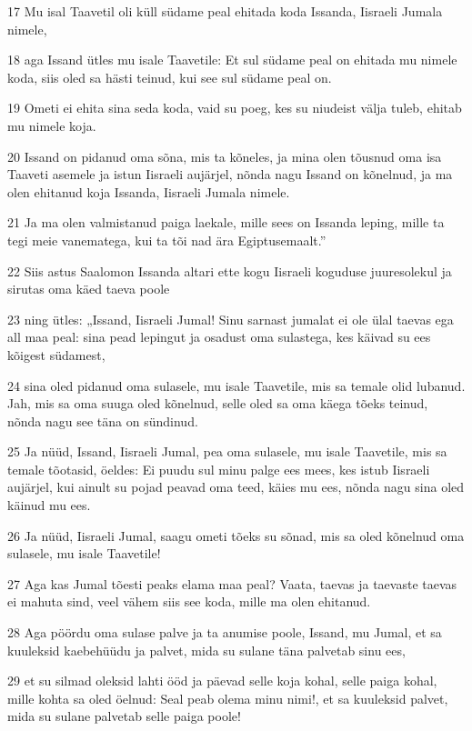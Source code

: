 \par 17 Mu isal Taavetil oli küll südame peal ehitada koda Issanda, Iisraeli Jumala nimele,
\par 18 aga Issand ütles mu isale Taavetile: Et sul südame peal on ehitada mu nimele koda, siis oled sa hästi teinud, kui see sul südame peal on.
\par 19 Ometi ei ehita sina seda koda, vaid su poeg, kes su niudeist välja tuleb, ehitab mu nimele koja.
\par 20 Issand on pidanud oma sõna, mis ta kõneles, ja mina olen tõusnud oma isa Taaveti asemele ja istun Iisraeli aujärjel, nõnda nagu Issand on kõnelnud, ja ma olen ehitanud koja Issanda, Iisraeli Jumala nimele.
\par 21 Ja ma olen valmistanud paiga laekale, mille sees on Issanda leping, mille ta tegi meie vanematega, kui ta tõi nad ära Egiptusemaalt.”
\par 22 Siis astus Saalomon Issanda altari ette kogu Iisraeli koguduse juuresolekul ja sirutas oma käed taeva poole
\par 23 ning ütles: „Issand, Iisraeli Jumal! Sinu sarnast jumalat ei ole ülal taevas ega all maa peal: sina pead lepingut ja osadust oma sulastega, kes käivad su ees kõigest südamest,
\par 24 sina oled pidanud oma sulasele, mu isale Taavetile, mis sa temale olid lubanud. Jah, mis sa oma suuga oled kõnelnud, selle oled sa oma käega tõeks teinud, nõnda nagu see täna on sündinud.
\par 25 Ja nüüd, Issand, Iisraeli Jumal, pea oma sulasele, mu isale Taavetile, mis sa temale tõotasid, öeldes: Ei puudu sul minu palge ees mees, kes istub Iisraeli aujärjel, kui ainult su pojad peavad oma teed, käies mu ees, nõnda nagu sina oled käinud mu ees.
\par 26 Ja nüüd, Iisraeli Jumal, saagu ometi tõeks su sõnad, mis sa oled kõnelnud oma sulasele, mu isale Taavetile!
\par 27 Aga kas Jumal tõesti peaks elama maa peal? Vaata, taevas ja taevaste taevas ei mahuta sind, veel vähem siis see koda, mille ma olen ehitanud.
\par 28 Aga pöördu oma sulase palve ja ta anumise poole, Issand, mu Jumal, et sa kuuleksid kaebehüüdu ja palvet, mida su sulane täna palvetab sinu ees,
\par 29 et su silmad oleksid lahti ööd ja päevad selle koja kohal, selle paiga kohal, mille kohta sa oled öelnud: Seal peab olema minu nimi!, et sa kuuleksid palvet, mida su sulane palvetab selle paiga poole!
